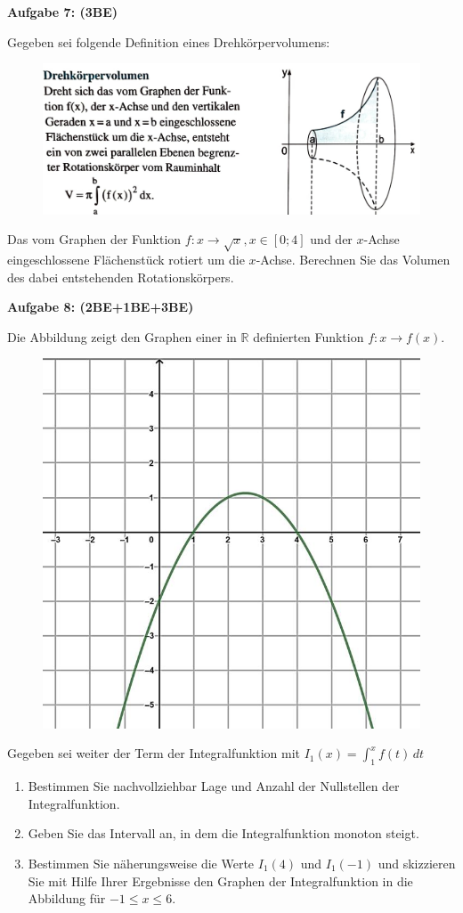 \documentclass[a4paper,12pt]{article}
\newcommand{\Aufgabe}[1]{
  {
  \vspace*{0.5cm}
  \textsf{\textbf{Aufgabe #1}}
  \vspace*{0.2cm}
  
  }
}
\begin{document}
\Aufgabe{7: (3BE)}
Gegeben sei folgende Definition eines Drehkörpervolumens:

  \begin{figure}[H]
    \vspace{0cm}
    \centering
    \includegraphics[width=0.7\linewidth]{Q12_SA_240103_6.jpg}
  \end{figure}

Das vom Graphen der Funktion $f: x\rightarrow \sqrt{x}, x \in [0; 4]$ und der $x$-Achse eingeschlossene Flächenstück rotiert um die $x$-Achse. Berechnen Sie das Volumen des dabei entstehenden Rotationskörpers.


\Aufgabe{8: (2BE+1BE+3BE)}
Die Abbildung zeigt den Graphen einer in $\mathbb{R}$ definierten Funktion $f: x\rightarrow f(x)$.

  \begin{figure}[H]
    \vspace{0cm}
    \centering
    \includegraphics[width=0.7\linewidth]{Q12_SA_240103_7.jpg}
  \end{figure}

Gegeben sei weiter der Term der Integralfunktion mit $I_1 (x)= \int_1^x f(t)\, dt$
\begin{enumerate}[label={\alph*)}]
  \item Bestimmen Sie nachvollziehbar Lage und Anzahl der Nullstellen der Integralfunktion.
  \item Geben Sie das Intervall an, in dem die Integralfunktion monoton steigt.
  \item Bestimmen Sie näherungsweise die Werte $I_1 (4)$ und $I_1 (-1)$ und skizzieren Sie mit Hilfe Ihrer Ergebnisse den Graphen der Integralfunktion in die Abbildung für $-1 \le x \le 6$.
\end{enumerate}
\end{document}
